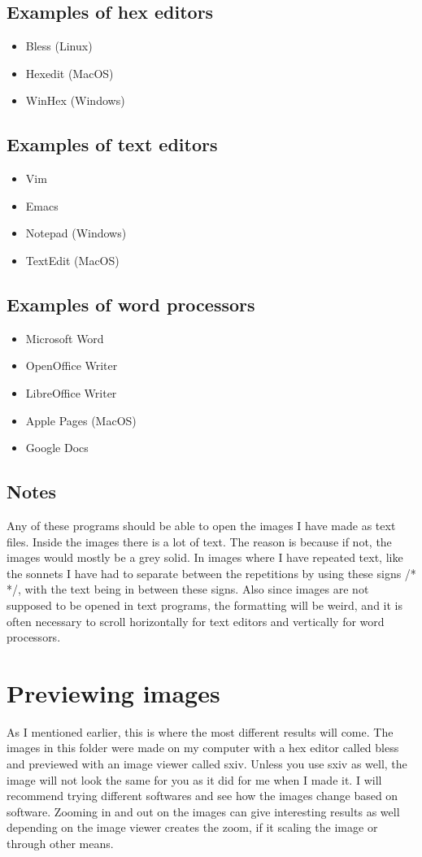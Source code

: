 \documentclass[12pt, letterpaper]{article}
\begin{document}
\subsection{Examples of hex editors}
\begin{itemize}
	\item Bless (Linux)
	\item Hexedit (MacOS)
	\item WinHex (Windows)
\end{itemize}

\subsection{Examples of text editors}
\begin{itemize}
	\item Vim
	\item Emacs
	\item Notepad (Windows)
	\item TextEdit (MacOS)
\end{itemize}

\subsection{Examples of word processors}
\begin{itemize}
	\item Microsoft Word
	\item OpenOffice Writer
	\item LibreOffice Writer
	\item Apple Pages (MacOS)
	\item Google Docs
\end{itemize}

\subsection{Notes}
Any of these programs should be able to open the images I have made as text
files. Inside the
images there is a lot of text. The reason is because if not, the images would
mostly be a grey solid. In images where I have repeated text, like the sonnets I
have had to separate between the repetitions by using these
signs /* */, with the text being in between these signs. Also since images are not
supposed to be opened in text programs, the formatting will be weird, and it is
often necessary to scroll horizontally for text editors and vertically for word
processors.

\section{Previewing images}
As I mentioned earlier, this is where the most different results will come. The
images in this folder were made on my computer with a hex editor called bless
and previewed with an image viewer called sxiv. Unless you use sxiv as well, the
image will not look the same for you as it did for me when I made it. I will
recommend
trying different softwares and see how the images change based on software.
Zooming in and out on the images can give interesting results as well depending
on the image viewer creates the zoom, if it scaling the image or through other
means.
\end{document}
